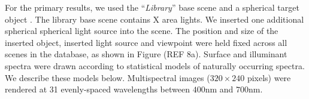\documentclass{jov}
\begin{document}

For the primary results, we used the ``{\it Library}'' base scene and a spherical target object .
The library base scene contains X area lights. We inserted one additional spherical spherical light source into the scene.
The position and size of the inserted object, inserted light source and viewpoint were held fixed across all scenes in the database,
as shown in Figure (REF 8a).
Surface and illuminant spectra were drawn according to statistical models of naturally occurring spectra.
We describe these models below.
Multispectral images ($320 \times 240$ pixels) were rendered at 31 evenly-spaced wavelengths between $400$nm and $700$nm.


\end{document}
